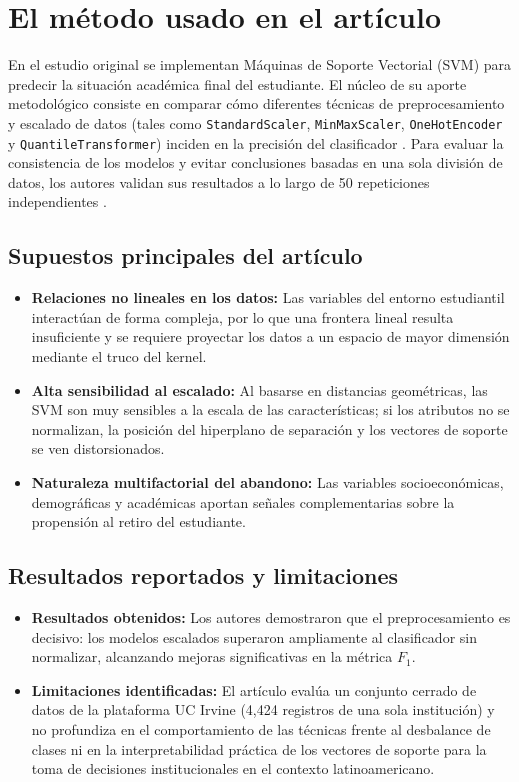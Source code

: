 \documentclass[12pt,a4paper]{article}
\begin{document}
\section{El método usado en el artículo}

En el estudio original se implementan Máquinas de Soporte Vectorial (SVM) para predecir la situación académica final del estudiante. El núcleo de su aporte metodológico consiste en comparar cómo diferentes técnicas de preprocesamiento y escalado de datos (tales como \texttt{StandardScaler}, \texttt{MinMaxScaler}, \texttt{OneHotEncoder} y \texttt{QuantileTransformer}) inciden en la precisión del clasificador \cite[pág.~8633]{boteju2024}. Para evaluar la consistencia de los modelos y evitar conclusiones basadas en una sola división de datos, los autores validan sus resultados a lo largo de 50 repeticiones independientes \cite[pág.~8635]{boteju2024}.

\subsection{Supuestos principales del artículo}
\begin{itemize}
    \item \textbf{Relaciones no lineales en los datos:} Las variables del entorno estudiantil interactúan de forma compleja, por lo que una frontera lineal resulta insuficiente y se requiere proyectar los datos a un espacio de mayor dimensión mediante el truco del kernel.
    \item \textbf{Alta sensibilidad al escalado:} Al basarse en distancias geométricas, las SVM son muy sensibles a la escala de las características; si los atributos no se normalizan, la posición del hiperplano de separación y los vectores de soporte se ven distorsionados.
    \item \textbf{Naturaleza multifactorial del abandono:} Las variables socioeconómicas, demográficas y académicas aportan señales complementarias sobre la propensión al retiro del estudiante.
\end{itemize}

\subsection{Resultados reportados y limitaciones}
\begin{itemize}
    \item \textbf{Resultados obtenidos:} Los autores demostraron que el preprocesamiento es decisivo: los modelos escalados superaron ampliamente al clasificador sin normalizar, alcanzando mejoras significativas en la métrica $F_1$.
    \item \textbf{Limitaciones identificadas:} El artículo evalúa un conjunto cerrado de datos de la plataforma UC Irvine (4,424 registros de una sola institución) y no profundiza en el comportamiento de las técnicas frente al desbalance de clases ni en la interpretabilidad práctica de los vectores de soporte para la toma de decisiones institucionales en el contexto latinoamericano.
\end{itemize}
\end{document}
